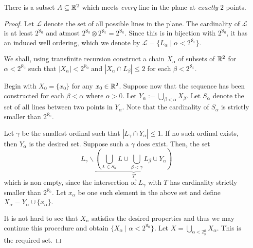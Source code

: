 \begin{theorem}[Mazurkiewicz, 1914]
    There is a subset $A\subseteq\mathbb{R}^2$ which meets \emph{every} line in the plane at \emph{exactly} $2$ points.
\end{theorem}
\begin{proof}
    Let $\mathscr L$ denote the set of all possible lines in the plane. The cardinality of $\mathscr L$ is at least $2^{\aleph_0}$ and atmost $2^{\aleph_0}\otimes 2^{\aleph_0} = 2^{\aleph_0}$. Since this is in bijection with $2^{\aleph_0}$, it has an induced well ordering, which we denote by $\mathscr L = \{L_\alpha\mid\alpha < 2^{\aleph_0}\}$.

    We shall, using transfinite recursion construct a chain $X_\alpha$ of subsets of $\mathbb{R}^2$ for $\alpha < 2^{\aleph_0}$ such that $|X_\alpha| < 2^{\aleph_0}$ and $|X_\alpha\cap L_\beta|\le 2$ for each $\beta < 2^{\aleph_0}$. 

    Begin with $X_0 = \{x_0\}$ for any $x_0\in \mathbb{R}^2$. Suppose now that the sequence has been constructed for each $\beta < \alpha$ where $\alpha > 0$. Let $Y_\alpha := \bigcup_{\beta < \alpha} X_\beta$. Let $S_\alpha$ denote the set of all lines between two points in $Y_\alpha$. Note that the cardinality of $S_\alpha$ is strictly smaller than $2^{\aleph_0}$. 

    Let $\gamma$ be the smallest ordinal such that $|L_\gamma\cap Y_\alpha|\le 1$. If no such ordinal exists, then $Y_\alpha$ is the desired set. Suppose such a $\gamma$ does exist. Then, the set 
    \begin{equation*}
        L_\gamma\backslash\underbrace{\left(\bigcup_{L\in S_\alpha}L\cup\bigcup_{\beta < \gamma} L_\beta\cup Y_\alpha\right)}_{T}
    \end{equation*}
    which is non empty, since the intersection of $L_\gamma$ with $T$ has cardinality strictly smaller than $2^{\aleph_0}$. Let $x_\alpha$ be one such element in the above set and define $X_\alpha = Y_\alpha\cup\{x_\alpha\}$.

    It is not hard to see that $X_\alpha$ satisfies the desired properties and thus we may continue this procedure and obtain $\{X_\alpha\mid\alpha < 2^{\aleph_0}\}$. Let $X = \bigcup_{\alpha < 2{^\aleph_0}} X_\alpha$. This is the required set.
\end{proof}
